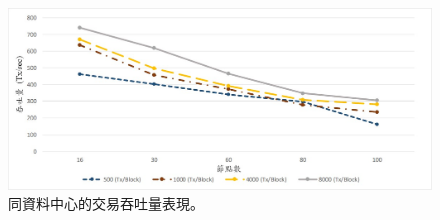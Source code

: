 \begin{figure}[h]
\centering
\includegraphics[scale=0.80]{images/61.jpg}
\caption{同資料中心的交易吞吐量表現。}
\label{i:byz-latency}
\end{figure}
